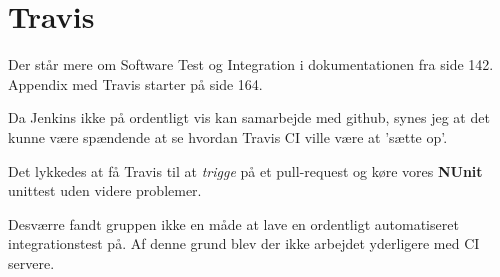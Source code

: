 \section{Travis}

Der står mere om Software Test og Integration i dokumentationen fra side 142. Appendix med Travis starter på side 164.

Da Jenkins ikke på ordentligt vis kan samarbejde med github, synes jeg at det kunne være spændende at se hvordan Travis CI ville være at 'sætte op'.

Det lykkedes at få Travis til at \textit{trigge} på et pull-request og køre vores \textbf{NUnit} unittest uden videre problemer.

Desværre fandt gruppen ikke en måde at lave en ordentligt automatiseret integrationstest på. Af denne grund blev der ikke arbejdet yderligere med CI servere.
